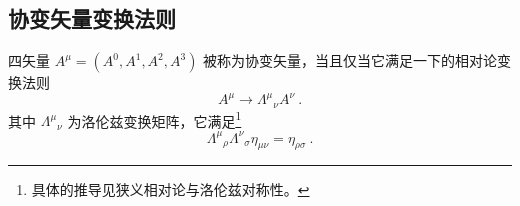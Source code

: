 

\subsection{协变矢量变换法则}
四矢量 $A^\mu=(A^0,A^1,A^2,A^3)$ 被称为协变矢量，当且仅当它满足一下的相对论变换法则
\begin{equation}
A^\mu\rightarrow \Lambda^{\mu}{}_\nu A^\nu~.
\end{equation}
其中 $\Lambda^\mu{}_\nu$ 为洛伦兹变换矩阵，它满足\footnote{具体的推导见狭义相对论与洛伦兹对称性。}
\begin{equation}
\Lambda^{\mu}{}_{\rho} \Lambda^{\nu}{}_{\sigma} \eta_{\mu\nu} = \eta_{\rho\sigma}~.
\end{equation}
